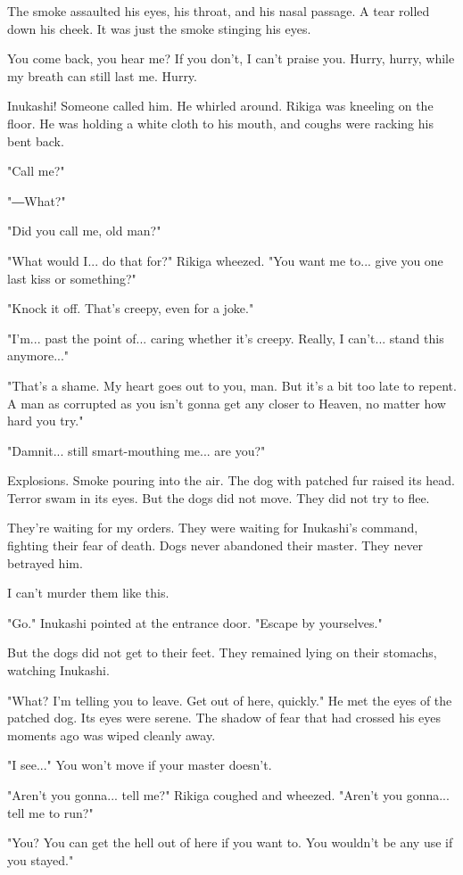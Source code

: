 The smoke assaulted his eyes, his throat, and his nasal passage. A tear
rolled down his cheek. It was just the smoke stinging his eyes.

You come back, you hear me? If you don't, I can't praise you. Hurry,
hurry, while my breath can still last me. Hurry.

Inukashi! Someone called him. He whirled around. Rikiga was kneeling on
the floor. He was holding a white cloth to his mouth, and coughs were
racking his bent back.

"Call me?"

"―What?"

"Did you call me, old man?"

"What would I... do that for?" Rikiga wheezed. "You want me to... give
you one last kiss or something?"

"Knock it off. That's creepy, even for a joke."

"I'm... past the point of... caring whether it's creepy. Really, I
can't... stand this anymore..."

"That's a shame. My heart goes out to you, man. But it's a bit too late
to repent. A man as corrupted as you isn't gonna get any closer to
Heaven, no matter how hard you try."

"Damnit... still smart-mouthing me... are you?"

Explosions. Smoke pouring into the air. The dog with patched fur raised
its head. Terror swam in its eyes. But the dogs did not move. They did
not try to flee.

They're waiting for my orders. They were waiting for Inukashi's command,
fighting their fear of death. Dogs never abandoned their master. They
never betrayed him.

I can't murder them like this.

"Go." Inukashi pointed at the entrance door. "Escape by yourselves."

But the dogs did not get to their feet. They remained lying on their
stomachs, watching Inukashi.

"What? I'm telling you to leave. Get out of here, quickly." He met the
eyes of the patched dog. Its eyes were serene. The shadow of fear that
had crossed his eyes moments ago was wiped cleanly away.

"I see..." You won't move if your master doesn't.

"Aren't you gonna... tell me?" Rikiga coughed and wheezed. "Aren't you
gonna... tell me to run?"

"You? You can get the hell out of here if you want to. You wouldn't be
any use if you stayed."

